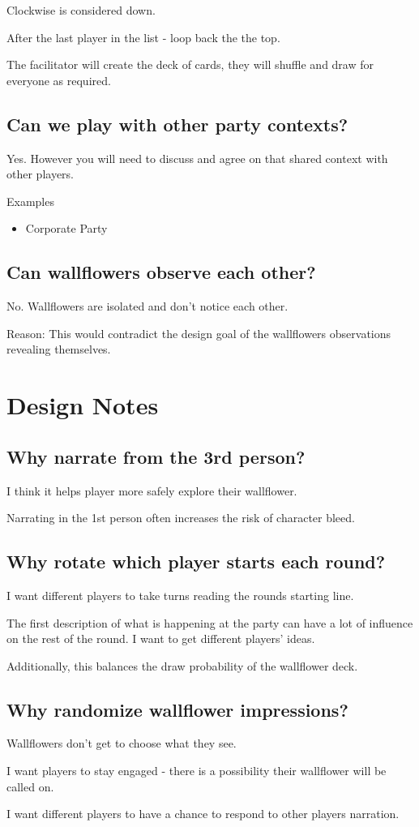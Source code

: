 \documentclass[letterpaper, 12pt]{article}
\newcommand{\cquestion}[1]{\subsection{#1}}
\begin{document}
{Clockwise is considered down.

After the last player in the list - loop back the the top.

The facilitator will create the deck of cards, they will shuffle and draw for everyone as required.


\cquestion{Can we play with other party contexts?}

Yes. However you will need to discuss and agree on that shared context with other players.

Examples

\begin{itemize}
	\item Corporate Party
\end{itemize}


\cquestion{Can wallflowers observe each other?}

No. Wallflowers are isolated and don't notice each other.

Reason: This would contradict the design goal of the wallflowers observations revealing themselves.


\pagebreak
\section{Design Notes}

\cquestion{Why narrate from the 3rd person?}

I think it helps player more safely explore their wallflower.

Narrating in the 1st person often increases the risk of character bleed.

\cquestion{Why rotate which player starts each round?}

I want different players to take turns reading the rounds starting line.

The first description of what is happening at the party can have a lot of influence on the rest of the round. I want to get different players' ideas.

Additionally, this balances the draw probability of the wallflower deck.


\cquestion{Why randomize wallflower impressions?}

Wallflowers don't get to choose what they see.

I want players to stay engaged - there is a possibility their wallflower will be called on.

I want different players to have a chance to respond to other players narration.

}
\end{document}
